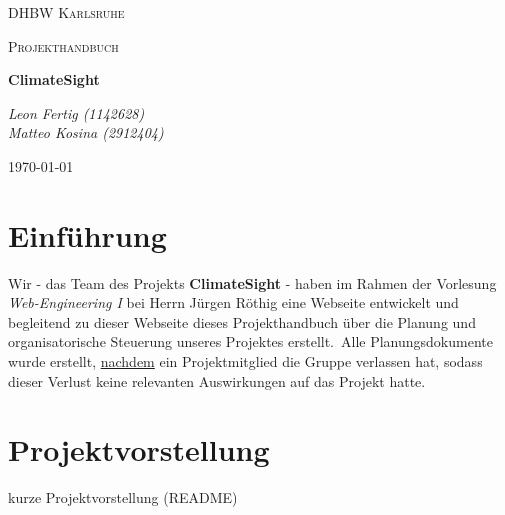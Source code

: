 \documentclass[12pt]{article}
\begin{document}

\begin{titlepage}
	\centering
	{\scshape\LARGE DHBW Karlsruhe\par}
	\vspace{1cm}
	{\scshape\Large Projekthandbuch\par}
	\vspace{1.5cm}
	{\huge\bfseries ClimateSight\par}
	\vspace{2cm}
	{\Large\itshape Leon Fertig (1142628)\\Matteo Kosina (2912404)\par}
	\vfill
	\vfill

	{\large \today\par}
\end{titlepage}

\tableofcontents
\thispagestyle{empty}
\newpage

\setcounter{page}{1}

\section{Einführung}
Wir - das Team des Projekts {\bf ClimateSight} - haben im Rahmen der Vorlesung {\it Web-Engineering I} bei Herrn Jürgen Röthig eine Webseite entwickelt und begleitend zu dieser Webseite dieses Projekthandbuch über die Planung und organisatorische Steuerung unseres Projektes erstellt.\
Alle Planungsdokumente wurde erstellt, \underline{nachdem} ein Projektmitglied die Gruppe verlassen hat, sodass dieser Verlust keine relevanten Auswirkungen auf das Projekt hatte.

\section{Projektvorstellung}
{\color{red} kurze Projektvorstellung (README)}
\end{document}
